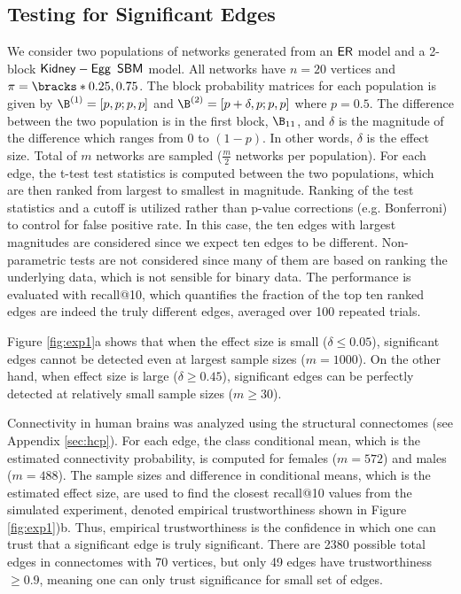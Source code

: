 \subsection{Testing for Significant Edges} \label{sec:exp1}
We consider two populations of networks generated from an $\operatorname{\mathsf{ER}}$ model and a 2-block $\mathsf{Kidney-Egg}~\operatorname{\mathsf{SBM}}$ model. All networks have $n=20$ vertices and $\pi = \bracks*{0.25, 0.75}$. The block probability matrices for each population is given by $\B^{(1)} = [p, p; p, p]$ and $\B^{(2)} = [p+\delta, p; p, p]$ where $p=0.5$. 
The difference between the two population is in the first block, $\B_{11}$, and $\delta$ is the magnitude of the difference which ranges from $0$ to $(1-p)$. In other words, $\delta$ is the effect size. Total of $m$ networks are sampled ($\frac{m}{2}$ networks per population). 
For each edge, the t-test test statistics is computed between the two populations, which are then ranked from largest to smallest in magnitude. Ranking of the test statistics and a cutoff is utilized rather than p-value corrections (e.g. Bonferroni) to control for false positive rate. In this case, the ten edges with largest magnitudes are considered since we expect ten edges to be different. 
Non-parametric tests are not considered since many of them are based on ranking the underlying data, which is not sensible for binary data. 
The performance is evaluated with recall@10, which quantifies the fraction of the top ten ranked edges are indeed the truly different edges, averaged over 100 repeated trials.

Figure \ref{fig:exp1}a shows that when the effect size is small ($\delta \leq 0.05$), significant edges cannot be detected even at largest sample sizes ($m=1000$). On the other hand, when effect size is large ($\delta \geq 0.45$), significant edges can be perfectly detected at relatively small sample sizes ($m \geq 30$). 

Connectivity in human brains was analyzed using the structural connectomes (see Appendix \ref{sec:hcp}). For each edge, the class conditional mean, which is the estimated connectivity probability, is computed for females ($m = 572$) and males ($m=488$). The sample sizes and difference in conditional means, which is the estimated effect size, are used to find the closest recall@10 values from the simulated experiment, denoted empirical trustworthiness shown in Figure \ref{fig:exp1})b. Thus, empirical trustworthiness is the confidence in which one can trust that a significant edge is truly significant. There are 2380 possible total edges in connectomes with 70 vertices, but only 49 edges have trustworthiness $\geq 0.9$, meaning one can only trust significance for small set of edges.

